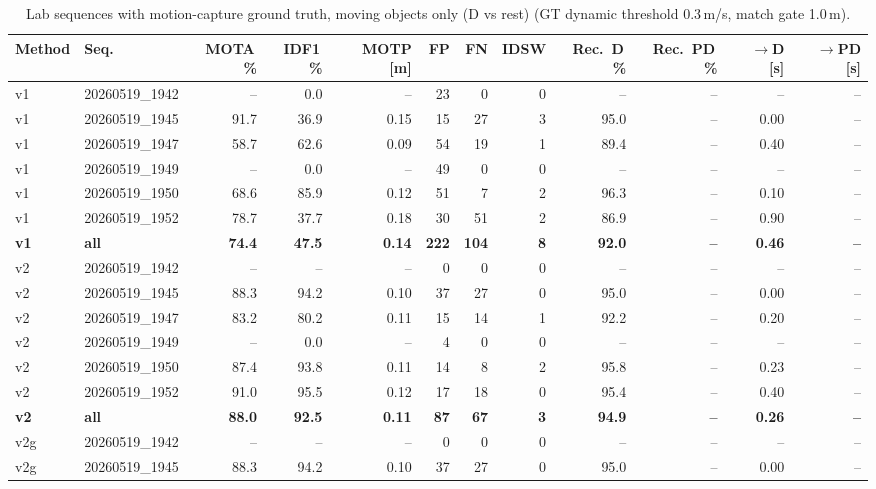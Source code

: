 \begin{table}[t]
\centering
\caption{Lab sequences with motion-capture ground truth, moving objects only (D vs rest) (GT dynamic threshold 0.3\,m/s, match gate 1.0\,m).}
\label{tab:own_r8b_dynamic_only}
\setlength{\tabcolsep}{3pt}
\begin{tabular}{llrrrrrrrrrr}
\toprule
Method & Seq. & MOTA\,\% & IDF1\,\% & MOTP [m] & FP & FN & IDSW & Rec.\ D\,\% & Rec.\ PD\,\% & $\to$D [s] & $\to$PD [s] \\
\midrule
v1 & 20260519\_1942 & -- & 0.0 & -- & 23 & 0 & 0 & -- & -- & -- & -- \\
v1 & 20260519\_1945 & 91.7 & 36.9 & 0.15 & 15 & 27 & 3 & 95.0 & -- & 0.00 & -- \\
v1 & 20260519\_1947 & 58.7 & 62.6 & 0.09 & 54 & 19 & 1 & 89.4 & -- & 0.40 & -- \\
v1 & 20260519\_1949 & -- & 0.0 & -- & 49 & 0 & 0 & -- & -- & -- & -- \\
v1 & 20260519\_1950 & 68.6 & 85.9 & 0.12 & 51 & 7 & 2 & 96.3 & -- & 0.10 & -- \\
v1 & 20260519\_1952 & 78.7 & 37.7 & 0.18 & 30 & 51 & 2 & 86.9 & -- & 0.90 & -- \\
\textbf{v1} & \textbf{all} & \textbf{74.4} & \textbf{47.5} & \textbf{0.14} & \textbf{222} & \textbf{104} & \textbf{8} & \textbf{92.0} & \textbf{--} & \textbf{0.46} & \textbf{--} \\
\midrule
v2 & 20260519\_1942 & -- & -- & -- & 0 & 0 & 0 & -- & -- & -- & -- \\
v2 & 20260519\_1945 & 88.3 & 94.2 & 0.10 & 37 & 27 & 0 & 95.0 & -- & 0.00 & -- \\
v2 & 20260519\_1947 & 83.2 & 80.2 & 0.11 & 15 & 14 & 1 & 92.2 & -- & 0.20 & -- \\
v2 & 20260519\_1949 & -- & 0.0 & -- & 4 & 0 & 0 & -- & -- & -- & -- \\
v2 & 20260519\_1950 & 87.4 & 93.8 & 0.11 & 14 & 8 & 2 & 95.8 & -- & 0.23 & -- \\
v2 & 20260519\_1952 & 91.0 & 95.5 & 0.12 & 17 & 18 & 0 & 95.4 & -- & 0.40 & -- \\
\textbf{v2} & \textbf{all} & \textbf{88.0} & \textbf{92.5} & \textbf{0.11} & \textbf{87} & \textbf{67} & \textbf{3} & \textbf{94.9} & \textbf{--} & \textbf{0.26} & \textbf{--} \\
\midrule
v2g & 20260519\_1942 & -- & -- & -- & 0 & 0 & 0 & -- & -- & -- & -- \\
v2g & 20260519\_1945 & 88.3 & 94.2 & 0.10 & 37 & 27 & 0 & 95.0 & -- & 0.00 & -- \\

\end{tabular}
\end{table}
